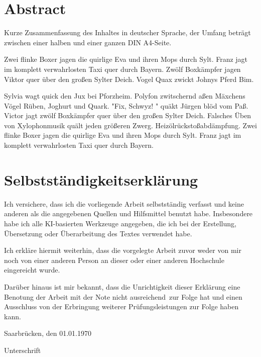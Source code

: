 \documentclass[paper=a4,fontsize=12pt,ngerman]{scrartcl}
\begin{document}
\pagestyle{plain}



\section*{Abstract}
Kurze Zusammenfassung des Inhaltes in deutscher Sprache, der Umfang beträgt 
zwischen einer halben und einer ganzen DIN A4-Seite.

Zwei flinke Boxer jagen die quirlige Eva und ihren Mops durch Sylt. Franz 
jagt im komplett verwahrlosten Taxi quer durch Bayern. Zwölf Boxkämpfer jagen 
Viktor quer über den großen Sylter Deich. Vogel Quax zwickt Johnys Pferd Bim.

Sylvia wagt quick den Jux bei Pforzheim. Polyfon zwitschernd aßen Mäxchens 
Vögel Rüben, Joghurt und Quark. "Fix, Schwyz! " quäkt Jürgen blöd vom Paß. 
Victor jagt zwölf Boxkämpfer quer über den großen Sylter Deich. Falsches Üben 
von Xylophonmusik quält jeden größeren Zwerg. Heizölrückstoßabdämpfung. Zwei 
flinke Boxer jagen die quirlige Eva und ihren Mops durch Sylt. Franz jagt im 
komplett verwahrlosten Taxi quer durch Bayern.


\newpage
\section*{Selbstständigkeitserklärung}
Ich versichere, dass ich die vorliegende Arbeit selbstständig verfasst und 
keine anderen als die angegebenen Quellen und Hilfsmittel benutzt habe.
Insbesondere habe ich alle KI-basierten Werkzeuge angegeben, die ich bei
der Erstellung, Übersetzung oder Überarbeitung des Textes verwendet habe.

Ich erkläre hiermit weiterhin, dass die vorgelegte Arbeit zuvor weder von mir 
noch von einer anderen Person an dieser oder einer anderen Hochschule 
eingereicht wurde.

Darüber hinaus ist mir bekannt, dass die Unrichtigkeit dieser Erklärung eine 
Benotung der Arbeit mit der Note \glqq nicht ausreichend\grqq \ zur Folge hat 
und einen Ausschluss von der Erbringung weiterer Prüfungsleistungen zur Folge 
haben kann.
\bigskip
 
Saarbrücken, den 01.01.1970

\smallskip
Unterschrift




\clearpage
\tableofcontents 
\end{document}
